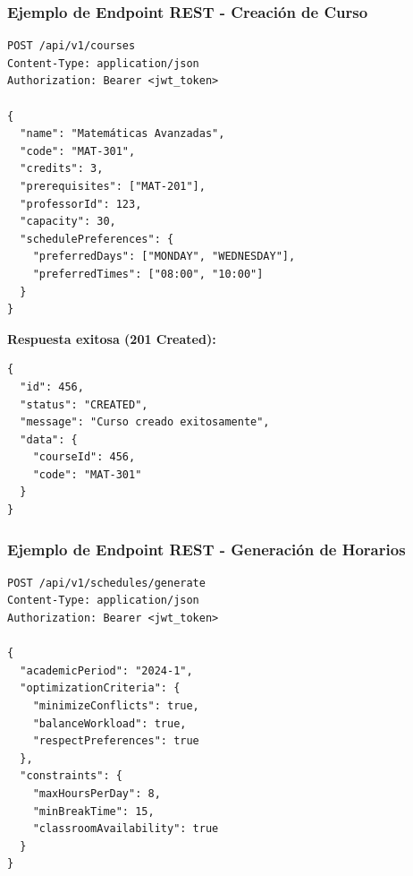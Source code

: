 \subsubsection{Ejemplo de Endpoint REST - Creación de Curso}
\begin{verbatim}
POST /api/v1/courses
Content-Type: application/json
Authorization: Bearer <jwt_token>

{
  "name": "Matemáticas Avanzadas",
  "code": "MAT-301",
  "credits": 3,
  "prerequisites": ["MAT-201"],
  "professorId": 123,
  "capacity": 30,
  "schedulePreferences": {
    "preferredDays": ["MONDAY", "WEDNESDAY"],
    "preferredTimes": ["08:00", "10:00"]
  }
}
\end{verbatim}

\textbf{Respuesta exitosa (201 Created):}
\begin{verbatim}
{
  "id": 456,
  "status": "CREATED",
  "message": "Curso creado exitosamente",
  "data": {
    "courseId": 456,
    "code": "MAT-301"
  }
}
\end{verbatim}

\subsubsection{Ejemplo de Endpoint REST - Generación de Horarios}
\begin{verbatim}
POST /api/v1/schedules/generate
Content-Type: application/json
Authorization: Bearer <jwt_token>

{
  "academicPeriod": "2024-1",
  "optimizationCriteria": {
    "minimizeConflicts": true,
    "balanceWorkload": true,
    "respectPreferences": true
  },
  "constraints": {
    "maxHoursPerDay": 8,
    "minBreakTime": 15,
    "classroomAvailability": true
  }
}
\end{verbatim}

